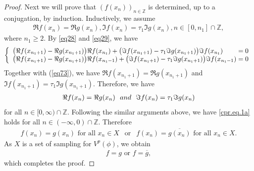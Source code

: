 \documentclass[10pt,a4paper]{amsart}
\newcommand{\Z}{\mathbb{Z}}
\begin{document}
\begin{proof}
	Next we will prove that $(f(x_n))_{n\in \Z}$ is determined, up to a conjugation, 
	by induction.
	Inductively, we assume
	\begin{align*}
		\Re f(x_n) = \Re g(x_n), \Im f(x_n) = \tau_1 \Im  g(x_n),  n\in [0,n_1]\cap \Z,
	\end{align*}
	where $n_1\ge 2$.
	By \eqref{eq28} and \eqref{eq29},  we have
	\begin{equation*}
		\left\{ \hskip .2in \begin{array}{ll}
			\hskip-.2in
			\big( \Re f(  x_{n_1+1}  )  -  \Re g(  x_{n_1+1}  ) \big)  \Re f(x_{n_1}) + \big(  \Im f(  x_{n_1+1}  )  -  \tau_1 \Im g(  x_{n_1+1}) \big)  \Im f(x_{n_1}  ) {}& \hskip-.10in =  0 \\
			\hskip-.2in
			\big( \Re f(  x_{n_1+1}  )  -  \Re g(  x_{n_1+1}  ) \big)  \Re f(x_{n_1-1}  ) 
			+   \big( \Im  f(  x_{n_1+1}  )  -  \tau_1 \Im g(  x_{n_1+1}  )  \big)  \Im  f(  x_{n_1-1}  ) {}& \hskip-.10in =   0	
		\end{array}\right.
	\end{equation*}
	Together with (\ref{eq73}), we have $\Re f(x_{n_1+1}) = \Re g(x_{n_1+1}) $ and $\Im  f(x_{n_1+1}) = \tau_1 \Im g(x_{n_1+1})$. 
	Therefore, we have 
	\begin{align}\label{cpr.eq.1a}
		\Re f(x_n) = \Re g(x_n) \ \ {\rm and} \ \ \Im f(x_n) = \tau_1 \Im  g(x_n)
	\end{align}
	for all $n\in [0,\infty)\cap \Z$. Following the similar arguments above, we  have \eqref{cpr.eq.1a}  holds for all $n\in (-\infty, 0)\cap \Z$. Therefore 
	\begin{align*}
		f(x_n)=g(x_n) \text{ for all } x_n\in X  \ \ \text{ or }  \ \ f(x_n)=\overline{g(x_n)} \text{ for all } x_n\in X.
	\end{align*}
	As $X$ is a set of sampling for $V^p(\phi)$, we obtain
	\begin{align*}
		f=g \text{ or } f=\overline{g},
	\end{align*}
	which completes the proof.
\end{proof}
\end{document}
